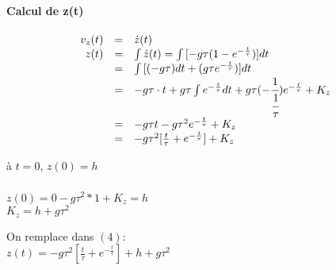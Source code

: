 			\paragraph{Calcul de z(t)}

			\[\begin{array}{rcl}
					v_z(t) &=& \dot{z}(t) \\
					z(t) &=& \int{\dot{z}(t)} = \int{[-g\tau (1-e^{-\frac{t}{\tau}})]dt} \\
							   &=& \int{[(-g\tau)dt + (g\tau e^{-\frac{t}{\tau}})]dt} \\
							   &=& -g\tau \cdot t + g\tau\int{e^{-\frac{t}{\tau}} dt} + g\tau(-\cfrac{1}{\cfrac{1}{\tau}})e^{-\frac{t}{\tau}}+K_z \\
							   &=& -g\tau t - g\tau^2 e^{-\frac{t}{\tau}} + K_z \\
						 &=& -g\tau ^2 [\frac{t}{\tau}+ e^{-\frac{t}{\tau}}] + K_z
			\end{array}\]
		

			à $t=0$, $z(0)=h$ ~\\
			~\\
			$z(0) = 0 - g\tau ^2*1+K_z = h$ ~\\
			$K_z = h+g\tau ^2$

			\begin{center}

			On remplace dans $(4)$: ~\\
			$z(t) = -g\tau ^2 [\frac{t}{\tau}+e^{-\frac{t}{\tau}}]+h+g\tau ^2$

		\end{center}
